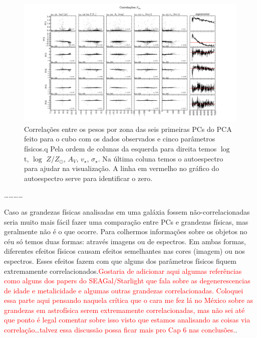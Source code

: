 \begin{figure}
    \includegraphics[width=1.3\textwidth, angle=-90]{figuras/K0277-correl-f_obs-PCvsPhys.pdf}
	\caption[Correlações PCs vs. par\^ametros f\'isicos - $F_{obs}$.]
    {Correlações entre os pesos por zona das seis primeiras PCs do PCA feito para o cubo com os dados observados e cinco
    parâmetros físicos.q Pela ordem de colunas da esquerda para direita temos $\log$ t, $\log$ $Z / Z_{\odot}$, $A_V$,
    $v_{\star}$, $\sigma_{\star}$. Na última coluna temos o autoespectro para ajudar na visualização. A linha em
    vermelho no gráfico do autoespectro serve para identificar o zero.}
    \label{fig:cap4:K0277correfobs}
\end{figure}


\ldots \dots \ldots \ldots

Caso as grandezas físicas analisadas em uma galáxia fossem não-correlacionadas seria muito mais fácil fazer uma
comparação entre PCs e grandezas físicas, mas geralmente não é o que ocorre. Para colhermos informações sobre os objetos
no céu só temos duas formas: através imagens ou de espectros. Em ambas formas, diferentes efeitos físicos causam efeitos
semelhantes nas cores (imagem) ou nos espectros. Esses efeitos fazem com que alguns dos parâmetros físicos fiquem
extremamente correlacionados.\ojo \citneed \textcolor{red}{Gostaria de adicionar aqui algumas referências como alguns
dos papers do SEAGal/Starlight que fala sobre as degenerescencias de idade e metalicidade e algumas outras grandezas
correlacionadas. Coloquei essa parte aqui pensando naquela crítica que o cara me fez lá no México sobre as grandezas em
astrofísica serem extremamente correlacionadas, mas não sei até que ponto é legal comentar sobre isso visto que
estamos analisando as coisas via correlação\ldots talvez essa discussão possa ficar mais pro Cap 6 nas conclusões.}.

